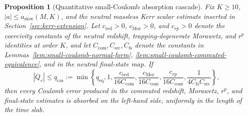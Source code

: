 \documentclass[11pt]{article}
\numberwithin{equation}{section}
\theoremstyle{plain}
\newtheorem{proposition}[theorem]{Proposition}
\theoremstyle{definition}
\theoremstyle{remark}
\begin{document}
\begin{proposition}[Quantitative small-Coulomb absorption cascade]\label{prop:small-coulomb-absorption-cascade}
Fix \(K\ge10\), \(|a|\le a_{\mathrm{slow}}(M,K)\), and the neutral massless Kerr scalar estimate inserted in Section~\ref{sec:kerr-extension}.  Let \(c_{\mathrm{red}}>0\), \(c_{\mathrm{Mor}}>0\), and \(c_{rp}>0\) denote the coercivity constants of the neutral redshift, trapping-degenerate Morawetz, and \(r^p\) identities at order \(K\), and let \(C_{\mathrm{com}},C_{\mathrm{src}},C_{\mathrm{fs}}\) denote the constants in Lemmas~\ref{lem:small-coulomb-normal-form}, \ref{lem:small-coulomb-commuted-equivalence}, and in the neutral final-state map.  If
\begin{equation}\label{eq:explicit-small-coulomb-cascade}
 |Q_e|\le q_{\mathrm{cas}}:=\min\left\{q_{\mathrm{eq}},1,
 \frac{c_{\mathrm{red}}}{16C_{\mathrm{com}}},
 \frac{c_{\mathrm{Mor}}}{16C_{\mathrm{com}}},
 \frac{c_{rp}}{16C_{\mathrm{com}}},
 \frac{1}{4C_{\mathrm{fs}}C_{\mathrm{src}}}\right\},
\end{equation}
then every Coulomb error produced in the commuted redshift, Morawetz, \(r^p\), and final-state estimates is absorbed on the left-hand side, uniformly in the length of the time slab.
\end{proposition}
\end{document}
